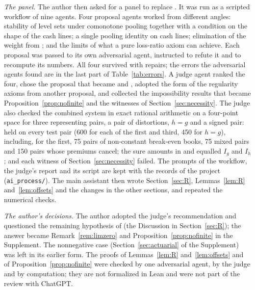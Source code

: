\emph{The panel.} The author then asked for a panel to replace \axCM. It was run as a scripted workflow of nine
agents. Four proposal agents worked from different angles: stability of level sets under comonotone pooling together
with a condition on the shape of the cash lines; a single pooling identity on cash lines; elimination of the weight
from \axCM; and the limits of what a pure loss-ratio axiom can achieve. Each proposal was passed to its own
adversarial agent, instructed to refute it and to recompute its numbers. All four survived with repairs; the errors
the adversarial agents found are in the last part of Table~\ref{tab:errors}. A judge agent ranked the four, chose
the proposal that became \axPe{} and \axR, adopted the form of the regularity axioms from another proposal, and
collected the impossibility results that became Proposition~\ref{prop:nofinite} and the witnesses of
Section~\ref{sec:necessity}. The judge also checked the combined system in exact rational arithmetic on a
four-point space for three representing pairs, a pair of distortions, $h=g$ and a signed pair: \axR{} held on
every test pair (600 for each of the first and third, 450 for $h=g$), including, for the first, 75 pairs of
non-constant break-even books, 75 mixed pairs and 150 pairs whose premiums cancel; the sure amounts in \axRC{} and
\axRM{} equalled $I_g$ and $I_h$; and each witness of Section~\ref{sec:necessity} failed. The prompts of the
workflow, the judge's report and its script are kept with the records of the project (\texttt{ai\_process/}).
The main assistant then wrote Section~\ref{sec:R}, Lemmas~\ref{lem:R} and~\ref{lem:offsets} and the changes in
the other sections, and repeated the numerical checks.

\emph{The author's decisions.} The author adopted the judge's recommendation and questioned the remaining
hypothesis of \axR{} (the Discussion in Section~\ref{sec:R}); the answer became Remark~\ref{rem:limzero} and
Proposition~\ref{prop:nofinite} in the Supplement. The nonnegative case (Section~\ref{sec:actuarial} of the Supplement) was left in
its earlier form. The proofs of Lemmas~\ref{lem:R} and~\ref{lem:offsets} and of Proposition~\ref{prop:nofinite}
were checked by one adversarial agent, by the judge and by computation; they are not formalized in Lean and were not
part of the review with ChatGPT.

